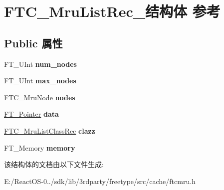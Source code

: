 \hypertarget{struct_f_t_c___mru_list_rec__}{}\section{F\+T\+C\+\_\+\+Mru\+List\+Rec\+\_\+结构体 参考}
\label{struct_f_t_c___mru_list_rec__}
\subsection*{Public 属性}
\begin{DoxyCompactItemize}
\item 
\mbox{\label{struct_f_t_c___mru_list_rec___ad7b6db28b89a8ffd14bb97e700418af4}} 
F\+T\+\_\+\+U\+Int {\bfseries num\+\_\+nodes}
\item 
\mbox{\label{struct_f_t_c___mru_list_rec___aba9c616ac3b931f9d46e87f122e64843}} 
F\+T\+\_\+\+U\+Int {\bfseries max\+\_\+nodes}
\item 
\mbox{\label{struct_f_t_c___mru_list_rec___a7ecf518fe77c341d2db31e1df8ebc231}} 
F\+T\+C\+\_\+\+Mru\+Node {\bfseries nodes}
\item 
\mbox{\label{struct_f_t_c___mru_list_rec___a907d4b6efcbaa83610e9f55710cf434f}} 
\hyperlink{interfacevoid}{F\+T\+\_\+\+Pointer} {\bfseries data}
\item 
\mbox{\label{struct_f_t_c___mru_list_rec___a83a983844599958c0647f74db67d5926}} 
\hyperlink{struct_f_t_c___mru_list_class_rec__}{F\+T\+C\+\_\+\+Mru\+List\+Class\+Rec} {\bfseries clazz}
\item 
\mbox{\label{struct_f_t_c___mru_list_rec___a6a7a6ed35fb525fa9f7bdb1b12a4213d}} 
F\+T\+\_\+\+Memory {\bfseries memory}
\end{DoxyCompactItemize}


该结构体的文档由以下文件生成\+:\begin{DoxyCompactItemize}
\item 
E\+:/\+React\+O\+S-\/0../sdk/lib/3rdparty/freetype/src/cache/ftcmru.\+h\end{DoxyCompactItemize}
